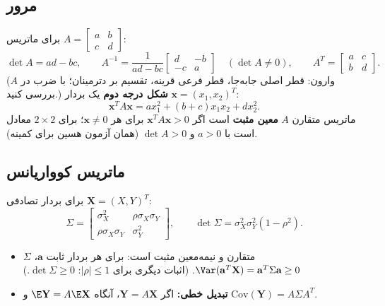 \subsection{مرور}
برای ماتریس $A=\begin{bmatrix}a&b\\c&d\end{bmatrix}$:
\[
\det A=ad-bc,\qquad A^{-1}=\frac{1}{ad-bc}\begin{bmatrix}d&-b\\-c&a\end{bmatrix}\quad(\det A\neq0),\qquad A^T=\begin{bmatrix}a&c\\b&d\end{bmatrix}.
\]
(وارون: قطر اصلی جابه‌جا، قطر فرعی قرینه، تقسیم بر دترمینان؛ با ضرب در $A$ بررسی کنید.) \textbf{شکل درجه دوم} یک بردار $\mathbf x=(x_1,x_2)^T$:
\[
\mathbf x^TA\mathbf x=ax_1^2+(b+c)x_1x_2+dx_2^2 .
\]
ماتریس متقارن $A$ \textbf{معین مثبت} است اگر $\mathbf x^TA\mathbf x>0$ برای هر $\mathbf x\neq0$؛ برای $2\times2$ معادل است با $a>0$ و $\det A>0$ (همان آزمون هسین برای کمینه).

\subsection{ماتریس کوواریانس}
برای بردار تصادفی $\mathbf X=(X,Y)^T$:
\[
\Sigma=\begin{bmatrix}\sigma_X^2&\rho\sigma_X\sigma_Y\\\rho\sigma_X\sigma_Y&\sigma_Y^2\end{bmatrix},\qquad\det\Sigma=\sigma_X^2\sigma_Y^2(1-\rho^2).
\]
\begin{itemize}
\item $\Sigma$ متقارن و نیمه‌معین مثبت است: برای هر بردار ثابت $\mathbf a$، $\Var(\mathbf a^T\mathbf X)=\mathbf a^T\Sigma\mathbf a\ge0$. (اثبات دیگری برای $|\rho|\le1$: $\det\Sigma\ge0$.)
\item \textbf{تبدیل خطی:} اگر $\mathbf Y=A\mathbf X$، آنگاه $\E\mathbf Y=A\E\mathbf X$ و $\mathrm{Cov}(\mathbf Y)=A\Sigma A^T$.
\end{itemize}

